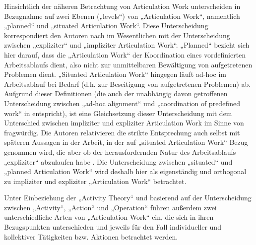 Hinsichtlich der näheren Betrachtung von Articulation Work unterscheiden \citet{Fjuk97} in Bezugnahme auf \citet{Strauss93} zwei Ebenen („levels“) von „Articulation Work“, namentlich „planned“ und „situated Articulation Work“. Diese Unterscheidung korrespondiert den Autoren nach im Wesentlichen mit der Unterscheidung zwischen „expliziter“ und „impliziter Articulation Work“. „Planned“ bezieht sich hier darauf, dass die „Articulation Work“ der Koordination eines vordefinierten Arbeitsablaufs dient, also nicht zur unmittelbaren Bewältigung von aufgetretenen Problemen dient. „Situated Articulation Work“ hingegen läuft ad-hoc im Arbeitsablauf bei Bedarf (d.h. zur Beseitigung von aufgetretenen Problemen) ab. Aufgrund dieser Definitionen (die auch der unabhängig davon getroffenen Unterscheidung zwischen „ad-hoc alignment“ und „coordination of predefined work“ in \citep{Schmidt00} entspricht), ist eine Gleichsetzung dieser Unterscheidung mit dem Unterschied zwischen impliziter und expliziter Articulation Work im Sinne von \citet{Strauss93} fragwürdig. Die Autoren relativieren die strikte Entsprechung auch selbst mit späteren Aussagen in der Arbeit, in der auf „situated Articulation Work“ Bezug genommen wird, die aber ob der herausfordernden Natur des Arbeitsablaufs „expliziter“ abzulaufen habe \citep[][S. 15]{Fjuk97}. Die Unterscheidung zwischen „situated“ und „planned Articulation Work“ wird deshalb hier als eigenständig und orthogonal zu impliziter und expliziter „Articulation Work“ betrachtet.

Unter Einbeziehung der „Activity Theory“ und basierend auf der Unterscheidung zwischen „Activity“, „Action“ und „Operation“ führen \citet{Fjuk97} außerdem zwei unterschiedliche Arten von „Articulation Work“ ein, die sich in ihren Bezugspunkten unterschieden und jeweils für den Fall individueller und kollektiver Tätigkeiten bzw. Aktionen betrachtet werden.  

